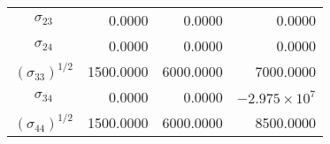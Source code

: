 \begin{center}
\begin{threeparttable}
\begin{tabular}{crrr}
  $\sigma_{23}$         &     0.0000 &     0.0000 &     0.0000 \\
  $\sigma_{24}$         &     0.0000 &     0.0000 &     0.0000 \\
  $(\sigma_{33})^{1/2}$ &  1500.0000 &  6000.0000 &  7000.0000 \\
  $\sigma_{34}$         &     0.0000 &     0.0000 & $-2.975\times10^7$\\
  $(\sigma_{44})^{1/2}$ &  1500.0000 &  6000.0000 &  8500.0000 \\
  \bottomrule
  \end{tabular}
\end{threeparttable}
\end{center}\vspace{0.5cm}
